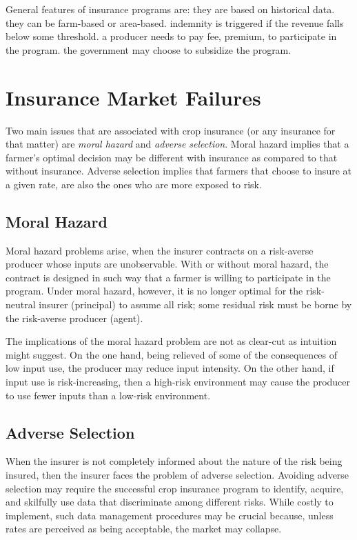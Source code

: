 \documentclass[
  oneside]{book}
\begin{document}
General features of insurance programs are: they are based on historical data. they can be farm-based or area-based. indemnity is triggered if the revenue falls below some threshold. a producer needs to pay fee, premium, to participate in the program. the government may choose to subsidize the program.

\hypertarget{insurance-market-failures}{%
\section{Insurance Market Failures}\label{insurance-market-failures}}

Two main issues that are associated with crop insurance (or any insurance for that matter) are \emph{moral hazard} and \emph{adverse selection}. Moral hazard implies that a farmer's optimal decision may be different with insurance as compared to that without insurance. Adverse selection implies that farmers that choose to insure at a given rate, are also the ones who are more exposed to risk.

\hypertarget{moral-hazard}{%
\subsection{Moral Hazard}\label{moral-hazard}}

Moral hazard problems arise, when the insurer contracts on a risk-averse producer whose inputs are unobservable. With or without moral hazard, the contract is designed in such way that a farmer is willing to participate in the program. Under moral hazard, however, it is no longer optimal for the risk-neutral insurer (principal) to assume all risk; some residual risk must be borne by the risk-averse producer (agent).

The implications of the moral hazard problem are not as clear-cut as intuition might suggest. On the one hand, being relieved of some of the consequences of low input use, the producer may reduce input intensity. On the other hand, if input use is risk-increasing, then a high-risk environment may cause the producer to use fewer inputs than a low-risk environment.

\hypertarget{adverse-selection}{%
\subsection{Adverse Selection}\label{adverse-selection}}

When the insurer is not completely informed about the nature of the risk being insured, then the insurer faces the problem of adverse selection. Avoiding adverse selection may require the successful crop insurance program to identify, acquire, and skilfully use data that discriminate among different risks. While costly to implement, such data management procedures may be crucial because, unless rates are perceived as being acceptable, the market may collapse.
\end{document}
